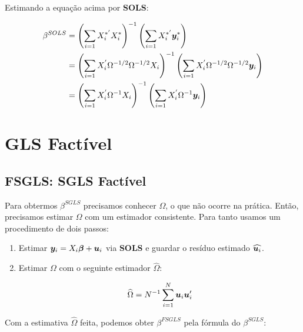 \documentclass[11pt, oneside, a4paper, article]{article}
\numberwithin{equation}{section}
\begin{document}
Estimando a equação acima por \textbf{SOLS}:

\vspace{-1.5 em}
\begin{align*}
\beta^{SOLS}
&=
\left( \sum_{i=1} X_{i}^{*'} X_{i}^{*} \right)^{-1}
\left( \sum_{i=1} X_{i}^{*'} \boldsymbol{y}_{i}^{*} \right)
\\
&=
\left( \sum_{i=1} X_{i}^{'} \Omega^{-1/2} \Omega^{-1/2} X_{i} \right)^{-1}
\left( \sum_{i=1} X_{i}^{'} \Omega^{-1/2} \Omega^{-1/2} \boldsymbol{y}_{i} \right)
\\
&=
\left( \sum_{i=1} X_{i}^{'} \Omega^{-1} X_{i} \right)^{-1}
\left( \sum_{i=1} X_{i}^{'} \Omega^{-1} \boldsymbol{y}_{i} \right)
\end{align*}


\clearpage
\section{GLS Factível}

\noindent
\citet[Sec.7.5 -- Feasible GLS, p.153]{wool-2010} 

\subsection*{FSGLS: SGLS Factível}

Para obtermos $\beta^{SGLS}$ precisamos conhecer $\Omega$, o que não ocorre na prática.
Então, precisamos estimar $\Omega$ com um estimador consistente.
Para tanto usamos um procedimento de dois passos:

\begin{enumerate}
\item  %
Estimar $\boldsymbol{y}_{i} = X_{i} \boldsymbol{\beta} + \boldsymbol{u}_{i}$ via \textbf{SOLS} e guardar o resíduo estimado $\widehat{\boldsymbol{u}_{i}}$.

\item  %
Estimar $\Omega$ com o seguinte estimador $\widehat{\Omega}$:

\vspace{-1.5 em}
\begin{align*}
	\widehat{\Omega} 
	= 
	N^{-1} \sum_{i=1}^{N} \boldsymbol{u}_{i} \boldsymbol{u}_{i}'
\end{align*}
\end{enumerate}

Com a estimativa $\widehat{\Omega}$ feita, podemos obter $\beta^{FSGLS}$ pela fórmula do $\beta^{SGLS}$:
\end{document}
